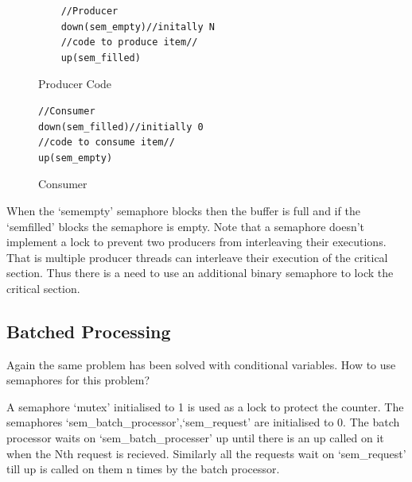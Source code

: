 \documentclass[12pt]{article}
\begin{document}
\begin{figure}[H]
    \begin{minipage}{.5\textwidth}
    \begin{tcolorbox}[colback=red!5!white,colframe=red!75!black]
    \begin{verbatim}
    //Producer 
    down(sem_empty)//initally N
    //code to produce item//
    up(sem_filled)
    \end{verbatim}
    \end{tcolorbox}
    \caption{Producer Code}
    \end{minipage}
    \hspace{0.05\textwidth}
    \begin{minipage}{.5\textwidth}
    \begin{tcolorbox}[colback=blue!5!white,colframe=blue!75!black]
    \begin{verbatim}
//Consumer
down(sem_filled)//initially 0
//code to consume item//
up(sem_empty)
    \end{verbatim}
    \end{tcolorbox}
    \caption{Consumer}
    \end{minipage}
    \end{figure}





When the `semempty' semaphore blocks then the buffer is full and if the `semfilled' blocks the semaphore is empty. 
Note that a semaphore doesn't implement a lock to prevent two producers from interleaving their executions. That is multiple producer threads can interleave their execution of the critical section. Thus there is a need to 
use an additional binary semaphore to lock the critical section. 


\subsection*{Batched Processing}
Again the same problem has been solved with conditional variables. How to use semaphores for this problem?

A semaphore `mutex' initialised to 1 is used as a lock to protect the counter. The semaphores `sem\_batch\_processor',`sem\_request' are initialised to 0.
The batch processor waits on `sem\_batch\_processer' up until there is an up called on it when the Nth request is recieved. Similarly all the requests wait on 
`sem\_request' till up is called on them n times by the batch processor. 
\end{document}
